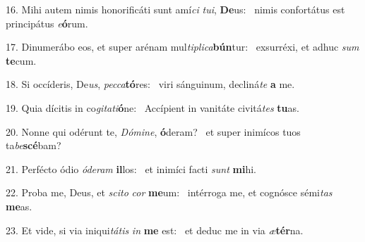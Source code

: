 16. Mihi autem nimis honorificáti sunt amí\textit{ci} \textit{tu}\textit{i}, \textbf{De}us: \ast\  nimis confortátus est principátus \textit{e}\textbf{ó}rum.\

17. Dinumerábo eos, et super arénam mul\textit{ti}\textit{pli}\textit{ca}\textbf{bún}tur: \ast\  exsurréxi, et adhuc \textit{sum} \textbf{te}cum.\

18. Si occíderis, De\textit{us}, \textit{pec}\textit{ca}\textbf{tó}res: \ast\  viri sánguinum, decliná\textit{te} \textbf{a} me.\

19. Quia dícitis in co\textit{gi}\textit{ta}\textit{ti}\textbf{ó}ne: \ast\  Accípient in vanitáte civitá\textit{tes} \textbf{tu}as.\

20. Nonne qui odérunt te, \textit{Dó}\textit{mi}\textit{ne}, \textbf{ó}deram? \ast\  et super inimícos tuos ta\textit{be}\textbf{scé}bam?\

21. Perfécto ódio \textit{ó}\textit{de}\textit{ram} \textbf{il}los: \ast\  et inimíci facti \textit{sunt} \textbf{mi}hi.\

22. Proba me, Deus, et \textit{sci}\textit{to} \textit{cor} \textbf{me}um: \ast\  intérroga me, et cognósce sémi\textit{tas} \textbf{me}as.\

23. Et vide, si via iniqui\textit{tá}\textit{tis} \textit{in} \textbf{me} est: \ast\  et deduc me in via \textit{æ}\textbf{tér}na.\

